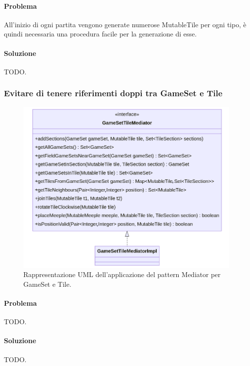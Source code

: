 \paragraph{Problema}
All'inizio di ogni partita vengono generate numerose MutableTile per ogni tipo, è quindi necessaria una procedura facile per la generazione di esse.
\paragraph{Soluzione}
TODO.
\clearpage

\subsubsection*{Evitare di tenere riferimenti doppi tra GameSet e Tile}
\begin{figure}[ht]
    \centering\includegraphics[scale=.35]{images/gamesettilemediator.png}
    \caption{Rappresentazione UML dell'applicazione del pattern Mediator per GameSet e Tile.}
\end{figure}
\paragraph{Problema}
TODO.
\paragraph{Soluzione}
TODO.
\clearpage

